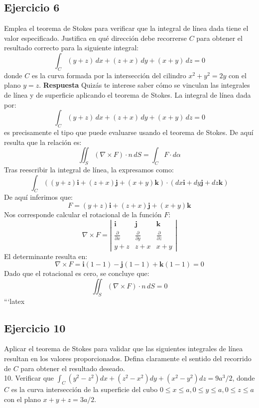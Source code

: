 \documentclass{report}
\begin{document}
\subsection*{Ejercicio 6}
Emplea el teorema de Stokes para verificar que la integral de línea dada tiene el valor especificado. Justifica en qué dirección debe recorrerse $C$ para obtener el resultado correcto para la siguiente integral:
\[
\int_C (y+z) \, dx + (z+x) \, dy + (x+y) \, dz = 0
\]
donde $C$ es la curva formada por la intersección del cilindro $x^2+y^2=2y$ con el plano $y=z$.
\textbf{Respuesta}
Quizás te interese saber cómo se vinculan las integrales de línea y de superficie aplicando el teorema de Stokes. La integral de línea dada por:
\[
\int_C (y + z) \, dx + (z + x) \, dy + (x + y) \, dz = 0
\]
es precisamente el tipo que puede evaluarse usando el teorema de Stokes. De aquí resulta que la relación es:
\[
\iint_S (\nabla \times F) \cdot n \, dS = \int_C F \cdot d\alpha
\]
Tras reescribir la integral de línea, la expresamos como:
\[
\int_C \left( (y + z) \mathbf{i} + (z + x) \mathbf{j} + (x + y) \mathbf{k} \right) \cdot (dx \mathbf{i} + dy \mathbf{j} + dz \mathbf{k})
\]
De aquí inferimos que:
\[
F = (y + z) \mathbf{i} + (z + x) \mathbf{j} + (x + y) \mathbf{k}
\]
Nos corresponde calcular el rotacional de la función \( F \):
\[
\nabla \times F = \left| \begin{array}{ccc}
\mathbf{i} & \mathbf{j} & \mathbf{k} \\
\frac{\partial}{\partial x} & \frac{\partial}{\partial y} & \frac{\partial}{\partial z} \\
y + z & z + x & x + y
\end{array} \right|
\]
El determinante resulta en:
\[
\nabla \times F = \mathbf{i}(1 - 1) - \mathbf{j}(1 - 1) + \mathbf{k}(1 - 1) = 0
\]
Dado que el rotacional es cero, se concluye que:
\[
\iint_S (\nabla \times F) \cdot n \, dS = 0
\]```latex


\subsection*{Ejercicio 10}
Aplicar el teorema de Stokes para validar que las siguientes integrales de línea resultan en los valores proporcionados. Defina claramente el sentido del recorrido de $C$ para obtener el resultado deseado.\\
10. Verificar que $\int_C\left(y^2-z^2\right) d x+\left(z^2-x^2\right) d y+\left(x^2-y^2\right) d z=9 a^3 / 2$, donde $C$ es la curva intersección de la superficie del cubo $0 \leq x \leq a, 0 \leq y \leq a, 0 \leq z \leq a$ con el plano $x+y+z=3 a / 2$.
\end{document}
